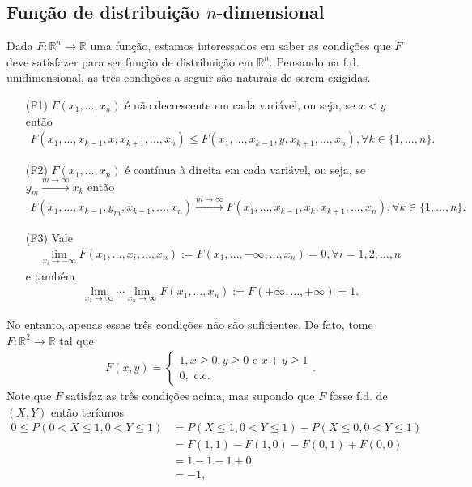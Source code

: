 \documentclass[../Notas.tex]{subfiles}
\begin{document}
\subsection{Função de distribuição $n$-dimensional}
Dada $F:\mathbb{R}^n\to\mathbb{R}$ uma função, estamos interessados em saber as condições que $F$ deve satisfazer para ser função de distribuição em $\mathbb{R}^n$. Pensando na f.d. unidimensional, as três condições a seguir são naturais de serem exigidas.
\begin{itemize}
    \item[(F1)] $F(x_1, \dots, x_n)$ é não decrescente em cada variável, ou seja, se $x<y$ então
    \begin{align*}
        F(x_1, \dots, x_{k-1}, x, x_{k+1}, \dots, x_n) \leq F(x_1, \dots, x_{k-1}, y, x_{k+1}, \dots, x_n), \forall k\in\{1,\dots, n\}.
    \end{align*}
    \item[(F2)] $F(x_1, \dots, x_n)$ é contínua à direita em cada variável, ou seja, se $y_m\xrightarrow{m\to\infty} x_k$ então
    \begin{align*}
        F(x_1, \dots, x_{k-1}, y_m, x_{k+1}, \dots, x_n) \xrightarrow{m\to\infty} F(x_1, \dots, x_{k-1}, x_k, x_{k+1}, \dots, x_n), \forall k\in\{1, \dots, n\}.
    \end{align*}
    \item[(F3)] Vale
    \begin{align*}
        \lim_{x_i\to -\infty} F(x_1, \dots, x_i, \dots, x_n) := F(x_1, \dots, -\infty, \dots, x_n) = 0, \forall i = 1,2, \dots, n
    \end{align*}
    e também
    \begin{align*}
        \lim_{x_1\to \infty}\cdots\lim_{x_n\to \infty} F(x_1, \dots, x_n) := F(+\infty, \dots, +\infty) = 1.
    \end{align*}
\end{itemize}
No entanto, apenas essas três condições não são suficientes. De fato, tome $F:\mathbb{R}^2\to\mathbb{R}$ tal que
\begin{align*}
    F(x,y) = \begin{cases}
    1, x\geq 0, y\geq 0 \text{ e } x+y\geq 1 \\
    0, \text{ c.c.}
    \end{cases}.
\end{align*}
Note que $F$ satisfaz as três condições acima, mas supondo que $F$ fosse f.d. de $(X,Y)$ então teríamos
\begin{align*}
    0\leq P(0 < X\leq 1, 0 < Y\leq 1) &= P(X\leq 1, 0 < Y\leq 1) - P(X\leq 0, 0 < Y\leq 1) \\
    &= F(1,1) - F(1,0) - F(0,1) + F(0,0) \\
    &= 1 - 1 - 1 + 0 \\
    &= -1,
\end{align*}
\end{document}
